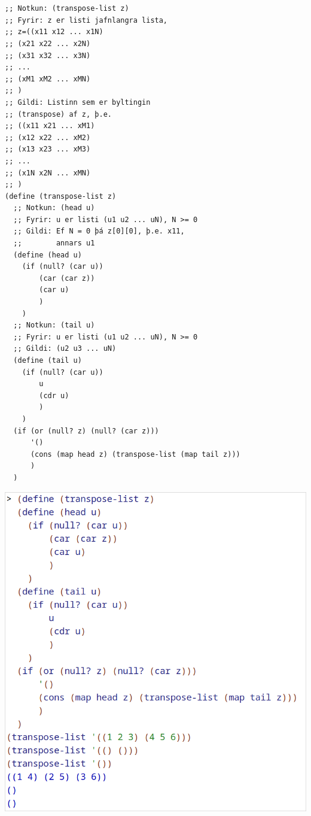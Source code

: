 \documentclass{article}
\begin{document}
	\section{}
	\begin{verbatim}
;; Notkun: (transpose-list z)
;; Fyrir: z er listi jafnlangra lista,
;; z=((x11 x12 ... x1N)
;; (x21 x22 ... x2N)
;; (x31 x32 ... x3N)
;; ...
;; (xM1 xM2 ... xMN)
;; )
;; Gildi: Listinn sem er byltingin
;; (transpose) af z, þ.e.
;; ((x11 x21 ... xM1)
;; (x12 x22 ... xM2)
;; (x13 x23 ... xM3)
;; ...
;; (x1N x2N ... xMN)
;; )
(define (transpose-list z)
  ;; Notkun: (head u)
  ;; Fyrir: u er listi (u1 u2 ... uN), N >= 0
  ;; Gildi: Ef N = 0 þá z[0][0], þ.e. x11,
  ;;        annars u1
  (define (head u)
    (if (null? (car u))
        (car (car z))
        (car u)
        )
    )
  ;; Notkun: (tail u)
  ;; Fyrir: u er listi (u1 u2 ... uN), N >= 0
  ;; Gildi: (u2 u3 ... uN)
  (define (tail u)
    (if (null? (car u))
        u
        (cdr u)
        )
    )
  (if (or (null? z) (null? (car z)))
      '()
      (cons (map head z) (transpose-list (map tail z)))
      )
  )
	\end{verbatim}
	\begin{center}
		\includegraphics[scale=0.35]{transpose.png}
	\end{center}
\end{document}
